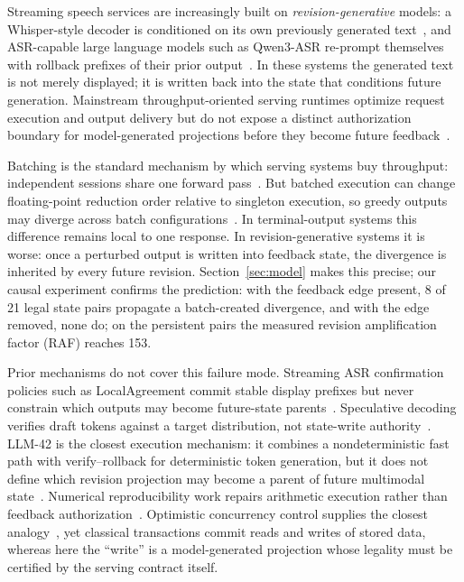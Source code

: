 
Streaming speech services are increasingly built on \emph{revision-generative}
models: a Whisper-style decoder is conditioned on its own previously generated
text~\cite{radford2023whisper,machacek2023whisperstreaming}, and ASR-capable
large language models such as Qwen3-ASR re-prompt themselves with rollback
prefixes of their prior output~\cite{shi2026qwen3asr}. In these systems the
generated text is not merely displayed; it is written back into the state that
conditions future generation. Mainstream throughput-oriented serving runtimes
optimize request execution and output delivery but do not expose a distinct
authorization boundary for model-generated projections before they become
future feedback~\cite{kwon2023vllm,yu2022orca,zheng2024sglang}.

Batching is the standard mechanism by which serving systems buy throughput:
independent sessions share one forward pass~\cite{kwon2023vllm,agrawal2024sarathi,zhong2024distserve,sun2024llumnix}.
But batched execution can change floating-point reduction order relative to
singleton execution, so greedy outputs may diverge across batch
configurations~\cite{yuan2025numerical}. In terminal-output systems this
difference remains local to one response. In revision-generative systems it
is worse: once a perturbed
output is written into feedback state, the divergence is inherited by every
future revision. Section~\ref{sec:model} makes this precise; our causal
experiment confirms the prediction: with the feedback edge present, 8 of 21
legal state pairs propagate a batch-created divergence, and with the edge
removed, none do; on the persistent pairs the measured revision amplification
factor (RAF) reaches 153.

Prior mechanisms do not cover this failure mode. Streaming ASR confirmation
policies such as LocalAgreement commit stable display prefixes but never
constrain which outputs may become future-state
parents~\cite{machacek2023whisperstreaming}. Speculative decoding verifies
draft tokens against a target distribution, not state-write
authority~\cite{leviathan2023specdec,chen2023specsample}. LLM-42 is the
closest execution mechanism: it combines a nondeterministic fast path with
verify--rollback for deterministic token generation, but it does not define
which revision projection may become a parent of future multimodal
state~\cite{zhang2026llm42}. Numerical reproducibility work repairs arithmetic
execution rather than feedback authorization~\cite{yuan2025numerical}.
Optimistic
concurrency control supplies the closest analogy~\cite{kung1981occ,bernstein1983mvcc},
yet classical transactions commit reads and writes of stored data, whereas
here the ``write'' is a model-generated projection whose legality must be
certified by the serving contract itself.

